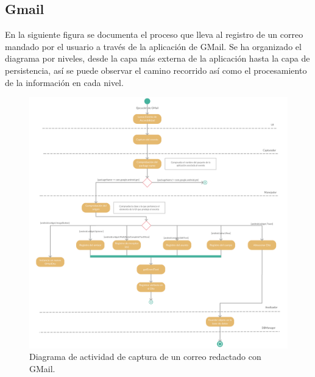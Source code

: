 \documentclass[12pt,a4paper,oneside]{book} %
\begin{document}
\subsection{Gmail}
En la siguiente figura se documenta el proceso que lleva al registro de un correo mandado por el usuario a través de la aplicación de GMail. Se ha organizado el diagrama por niveles, desde la capa más externa de la aplicación hasta la capa de persistencia, así se puede observar el camino recorrido así como el procesamiento de la información en cada nivel.
\begin{figure}[H]
		\includegraphics[width=1.4\textwidth,center]{pictures/activity/gmailActivityDiagram.png} 
  \caption[Diagrama actividad GMail]{Diagrama de actividad de captura de un correo redactado con GMail.}
  \label{fig:Diagrama actividad GMail}
\end{figure}
\end{document}
